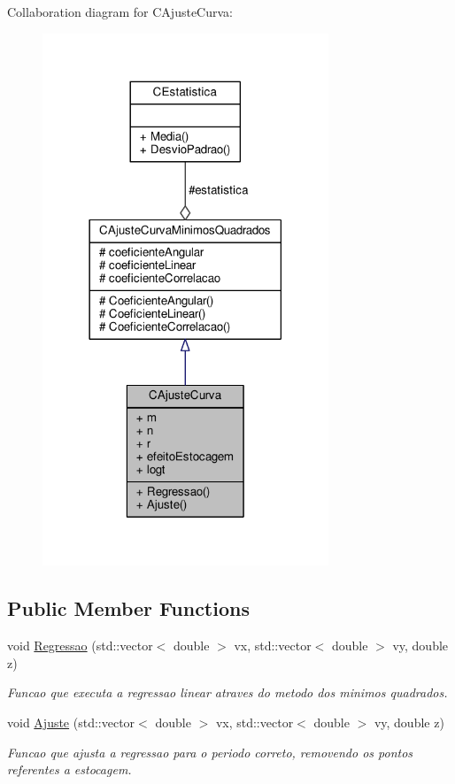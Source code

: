 Collaboration diagram for C\-Ajuste\-Curva\-:
\nopagebreak
\begin{figure}[H]
\begin{center}
\leavevmode
\includegraphics[width=242pt]{classCAjusteCurva__coll__graph}
\end{center}
\end{figure}
\subsection*{Public Member Functions}
\begin{DoxyCompactItemize}
\item 
\hypertarget{classCAjusteCurva_a0687a76e2f668770408276cf0b9731a5}{void \hyperlink{classCAjusteCurva_a0687a76e2f668770408276cf0b9731a5}{Regressao} (std\-::vector$<$ double $>$ vx, std\-::vector$<$ double $>$ vy, double z)}\label{classCAjusteCurva_a0687a76e2f668770408276cf0b9731a5}

\begin{DoxyCompactList}\small\item\em Funcao que executa a regressao linear atraves do metodo dos minimos quadrados. \end{DoxyCompactList}\item 
\hypertarget{classCAjusteCurva_aa7a0c356cb514926d8fcc96f069744b3}{void \hyperlink{classCAjusteCurva_aa7a0c356cb514926d8fcc96f069744b3}{Ajuste} (std\-::vector$<$ double $>$ vx, std\-::vector$<$ double $>$ vy, double z)}\label{classCAjusteCurva_aa7a0c356cb514926d8fcc96f069744b3}

\begin{DoxyCompactList}\small\item\em Funcao que ajusta a regressao para o periodo correto, removendo os pontos referentes a estocagem. \end{DoxyCompactList}\end{DoxyCompactItemize}
